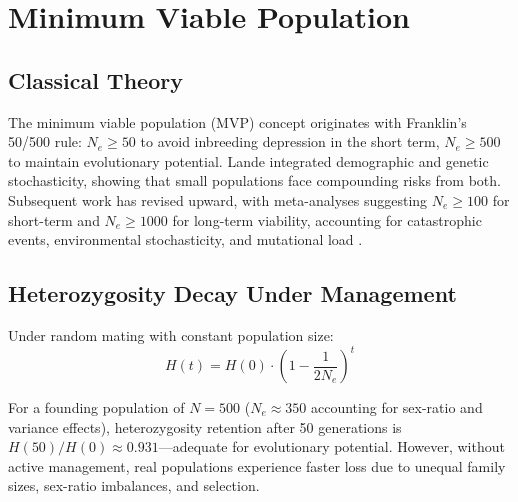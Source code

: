 \documentclass[11pt,letterpaper]{article}
\begin{document}
\section{Minimum Viable Population}
\label{sec:population}

\subsection{Classical Theory}

The minimum viable population (MVP) concept originates with Franklin's
\cite{franklin1980evolutionary} 50/500 rule: $N_e \geq 50$ to avoid inbreeding
depression in the short term, $N_e \geq 500$ to maintain evolutionary potential.
Lande \cite{lande1988genetics} integrated demographic and genetic stochasticity,
showing that small populations face compounding risks from both.
Subsequent work \cite{reed2005estimates,frankham2010introduction,smith2023minimum}
has revised upward, with meta-analyses suggesting $N_e \geq 100$ for short-term and
$N_e \geq 1000$ for long-term viability, accounting for catastrophic events,
environmental stochasticity, and mutational load
\cite{lynch1995mutation,kimura1963mutation}.

\subsection{Heterozygosity Decay Under Management}

Under random mating with constant population size:
\begin{equation}
H(t) = H(0) \cdot \left(1 - \frac{1}{2N_e}\right)^t
\label{eq:het_decay}
\end{equation}

For a founding population of $N = 500$ ($N_e \approx 350$ accounting for
sex-ratio and variance effects), heterozygosity retention after 50 generations
is $H(50)/H(0) \approx 0.931$---adequate for evolutionary potential. However,
without active management, real populations experience faster loss due to
unequal family sizes, sex-ratio imbalances, and selection.
\end{document}
